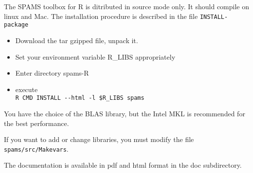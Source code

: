 The SPAMS toolbox for R is ditributed in source mode only.
It should compile on linux and Mac.
The installation procedure is described in the file \verb=INSTALL-package=
\begin{itemize}
\item Download the tar gzipped file, unpack it.
\item Set your environment variable R\_LIBS appropriately
\item Enter directory spams-R
\item execute \\
  \verb=R CMD INSTALL --html -l $R_LIBS spams=
\end{itemize}

You have the choice of the BLAS library, but the Intel
MKL is recommended for the best performance.

If you want to add or change libraries, you must modify
the file \verb=spams/src/Makevars=.

The documentation is available in pdf and html format in the doc subdirectory.
